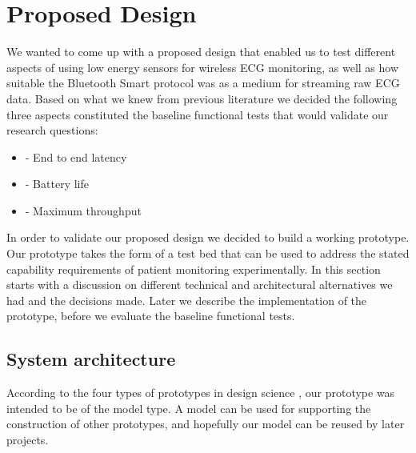 \section{Proposed Design} 

\label{sec:proposed_design}

We wanted to come up with a proposed design that enabled us to test different aspects of using low energy sensors for wireless ECG monitoring, as well as how suitable the Bluetooth Smart protocol was as a medium for streaming raw ECG data. Based on what we knew from previous literature we decided the following three aspects constituted the baseline functional tests that would validate our research questions:
\begin{itemize}
	
	\item - End to end latency
	
	\item - Battery life
	
	\item - Maximum throughput
\end{itemize}

In order to validate our proposed design we decided to build a working prototype. Our prototype takes the form of a test bed that can be used to address the stated capability requirements of patient monitoring experimentally. In this section starts with a discussion on different technical and architectural alternatives we had and the decisions made. Later we describe the implementation of the prototype, before we evaluate the baseline functional tests.


\subsection{System architecture} %
\label{sub:system_architecture}

According to the four types of prototypes in design science \cite{ds_bok1_25}, our prototype was intended to be of the model type. A model can be used for supporting the construction of other prototypes, and hopefully our model can be reused by later projects.

